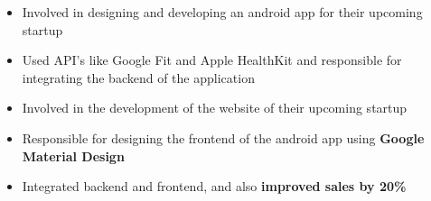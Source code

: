 \documentclass[10pt,a4paper]{altacv}
\begin{document}

\begin{fullwidth}
\makecvheader
\end{fullwidth}


\begin{itemize}
\item Involved in designing and developing an android app for their upcoming startup 
\item Used API's like Google Fit and Apple HealthKit and responsible for integrating the backend of the application
\item Involved in the development of the website of their upcoming startup
\end{itemize}

\divider

		
\begin{itemize}
\item Responsible for designing the frontend of the android app using \textbf{Google Material Design}
\item Integrated backend and frontend, and also \textbf{improved sales by 20\%}
\end{itemize}

\divider

\end{document}
